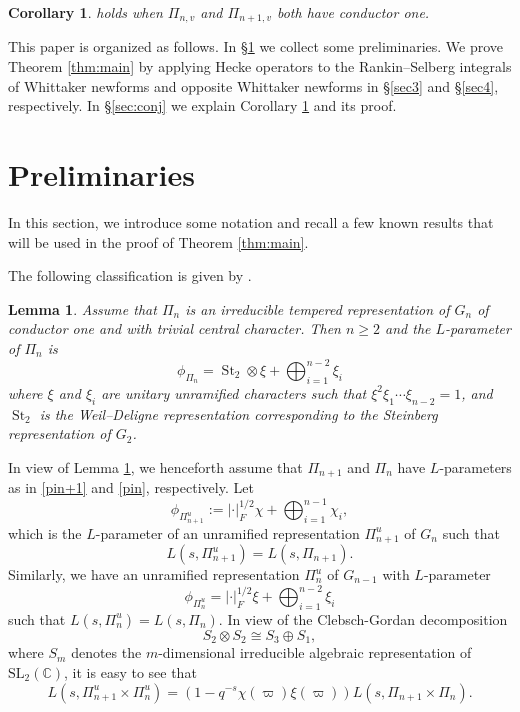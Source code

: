 \documentclass[11pt, a4paper]{amsart}
\newcommand{\BC}{{\mathbb {C}}}
\newcommand{\SL}{{\mathrm{SL}}}
\newcommand{\abs}[1]{\lvert#1\rvert}
\newcommand{\be}{\begin {equation}}
\newcommand{\ee}{\end {equation}}
\newcommand{\St}{\operatorname{St}}
\theoremstyle{plain}
\theoremstyle{plain}
\theoremstyle{plain}
\newtheorem{leml}[lem]{Lemma}
\theoremstyle{plain}
\theoremstyle{remark}
\theoremstyle{definition}
\theoremstyle{plain}
\newtheorem{corollary}[theorem]{Corollary}
\numberwithin{equation}{section}
\begin{document}
\begin{corollary}\label{cor}
\cite[Conjecture 3.6.10]{DZ} holds when $\Pi_{n,v}$ and $\Pi_{n+1,v}$ both have conductor one.
\end{corollary}

This paper is organized as follows.  In \S\ref{sec2} we collect some preliminaries. We prove Theorem \ref{thm:main} by applying Hecke operators to the Rankin--Selberg integrals of Whittaker newforms 
and opposite Whittaker newforms in \S\ref{sec3} and \S\ref{sec4}, respectively. In \S\ref{sec:conj} we explain Corollary \ref{cor} and its proof.

\section{Preliminaries} \label{sec2}

In this section, we introduce some notation and recall a few known results that will be used in  the proof of Theorem \ref{thm:main}.

The following classification is given by \cite[Lemma 3.6.1]{DZ}.

\begin{leml}\label{prop:class} 
Assume that $\Pi_n$ is an irreducible tempered representation of
$G_n$ of conductor one and with trivial central character.  Then
$n\geq2$ and the $L$-parameter of $\Pi_n$ is 
\be \label{pin}
\phi_{\Pi_n} =  \St_2\otimes \xi + \bigoplus^{n-2}_{i=1} \xi_i 
\ee
where $\xi$ and $\xi_i$ are unitary unramified characters such that
$\xi^2\xi_1\cdots\xi_{n-2}=1$, and $\St_2$ is the Weil--Deligne representation corresponding to the Steinberg
representation of $G_2$.  
\end{leml}


In view of  Lemma \ref{prop:class}, we henceforth assume that
$\Pi_{n+1}$ and $\Pi_n$ have $L$-parameters as in \eqref{pin+1} and \eqref{pin},
respectively. Let 
\be \label{unr}
\phi_{\Pi_{n+1}^u} := \abs{\cdot}_F^{1/2} \chi + \bigoplus^{n-1}_{i=1} \chi_i,
\ee
which is the $L$-parameter of an unramified representation $\Pi_{n+1}^u$ of $G_n$ such that 
\[
L(s, \Pi_{n+1}^u) = L(s, \Pi_{n+1}).
\]
Similarly, we have an unramified representation $\Pi_{n}^u$ of $G_{n-1}$ with $L$-parameter 
\[
\phi_{\Pi_n^u} =  \abs{\cdot}_F^{1/2} \xi + \bigoplus^{n-2}_{i=1} \xi_i
\]
such that  $L(s, \Pi_n^u) = L(s,\Pi_n)$.  In view of the Clebsch-Gordan decomposition 
\[
S_2\otimes S_2 \cong S_3 \oplus S_1,
\]
where $S_m$ denotes the $m$-dimensional irreducible algebraic representation of $\SL_2(\BC)$, 
it is easy to see that
\be\label{naive}
L(s, \Pi_{n+1}^u \times \Pi_n^u ) = (1-q^{-s}\chi(\varpi)\xi(\varpi)) L(s, \Pi_{n+1} \times \Pi_n). 
\ee
\end{document}
